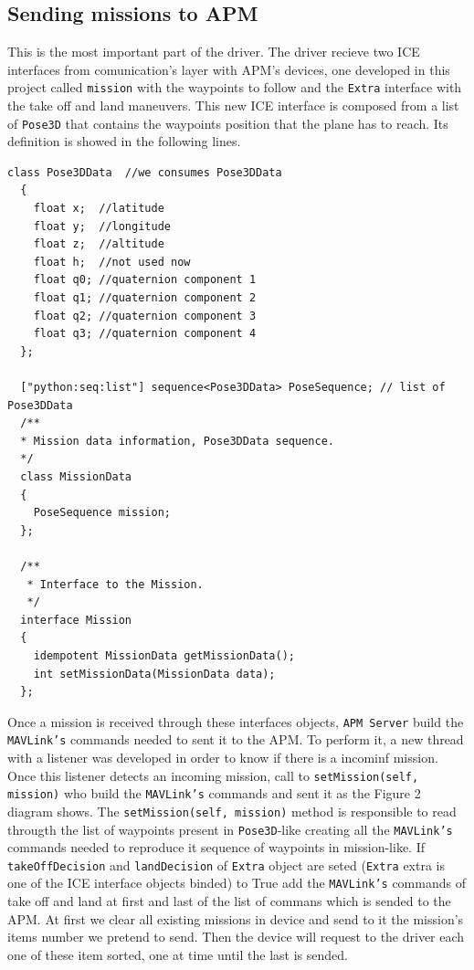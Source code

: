 \documentclass{llncs}
\begin{document}
\subsection{Sending missions to APM}
\label{sec:mission_apm}

This is the most important part of the driver. The driver recieve two ICE interfaces from comunication's layer with APM's devices, one developed in this project called \texttt{mission} with the waypoints to follow and the \texttt{Extra} interface with the take off and land maneuvers. This new ICE interface is composed from a list of \texttt{Pose3D} that contains the waypoints position that the plane has to reach. Its definition is showed in the following lines.

\begin{verbatim}
class Pose3DData  //we consumes Pose3DData
  {
	float x;  //latitude
	float y;  //longitude
	float z;  //altitude
	float h;  //not used now
	float q0; //quaternion component 1
	float q1; //quaternion component 2
	float q2; //quaternion component 3
	float q3; //quaternion component 4
  };

  ["python:seq:list"] sequence<Pose3DData> PoseSequence; // list of Pose3DData
  /**
  * Mission data information, Pose3DData sequence. 
  */
  class MissionData
  {
    PoseSequence mission;
  };

  /** 
   * Interface to the Mission.
   */
  interface Mission
  {
    idempotent MissionData getMissionData();
    int setMissionData(MissionData data);
  };
\end{verbatim}

Once a mission is received through these interfaces objects, \texttt{APM Server} build the \texttt{MAVLink's} commands needed to sent it to the APM. To perform it, a new thread with a listener was developed in order to know if there is a incominf mission.
Once this listener detects an incoming mission, call to \texttt{setMission(self, mission)} who build the \texttt{MAVLink's} commands and sent it as the Figure 2 diagram shows.
The \texttt{setMission(self, mission)} method is responsible to read througth the list of waypoints present in \texttt{Pose3D}-like creating all the \texttt{MAVLink's} commands needed to reproduce it sequence of waypoints in mission-like. If \texttt{takeOffDecision} and \texttt{landDecision} of \texttt{Extra} object are seted (\texttt{Extra} extra is one of the ICE interface objects binded) to True add the \texttt{MAVLink's} commands of take off and land at first and last of the list of commans which is sended to the APM.
At first we clear all existing missions in device and send to it the mission's items number we pretend to send. Then the device will request to the driver each one of these item sorted, one at time until the last is sended. 
\end{document}
